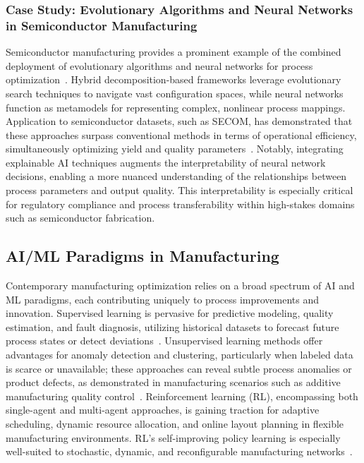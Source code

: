 \documentclass[sigconf]{acmart}
\begin{document}
\subsubsection{Case Study: Evolutionary Algorithms and Neural Networks in Semiconductor Manufacturing}

Semiconductor manufacturing provides a prominent example of the combined deployment of evolutionary algorithms and neural networks for process optimization~\cite{ref22}. Hybrid decomposition-based frameworks leverage evolutionary search techniques to navigate vast configuration spaces, while neural networks function as metamodels for representing complex, nonlinear process mappings. Application to semiconductor datasets, such as SECOM, has demonstrated that these approaches surpass conventional methods in terms of operational efficiency, simultaneously optimizing yield and quality parameters~\cite{ref22}. Notably, integrating explainable AI techniques augments the interpretability of neural network decisions, enabling a more nuanced understanding of the relationships between process parameters and output quality. This interpretability is especially critical for regulatory compliance and process transferability within high-stakes domains such as semiconductor fabrication.

\subsection{AI/ML Paradigms in Manufacturing}

Contemporary manufacturing optimization relies on a broad spectrum of AI and ML paradigms, each contributing uniquely to process improvements and innovation. Supervised learning is pervasive for predictive modeling, quality estimation, and fault diagnosis, utilizing historical datasets to forecast future process states or detect deviations~\cite{ref2,ref6,ref13,ref14,ref19,ref20,ref27,ref30,ref37,ref38,ref42,ref44,ref45,ref50,ref52}. Unsupervised learning methods offer advantages for anomaly detection and clustering, particularly when labeled data is scarce or unavailable; these approaches can reveal subtle process anomalies or product defects, as demonstrated in manufacturing scenarios such as additive manufacturing quality control~\cite{ref20,ref27}. Reinforcement learning (RL), encompassing both single-agent and multi-agent approaches, is gaining traction for adaptive scheduling, dynamic resource allocation, and online layout planning in flexible manufacturing environments. RL's self-improving policy learning is especially well-suited to stochastic, dynamic, and reconfigurable manufacturing networks~\cite{ref6,ref13,ref14,ref19,ref30,ref38,ref44,ref56}.
\end{document}
